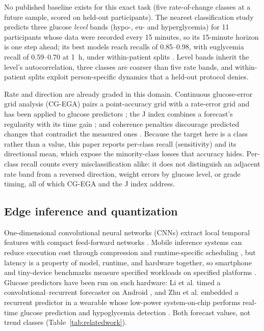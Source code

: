 \documentclass[10pt,twocolumn]{article}
\begin{document}
No published baseline exists for this exact task (five rate-of-change
classes at a future sample, scored on held-out participants). The
nearest classification study predicts three glucose \emph{level} bands
(hypo-, eu- and hyperglycemia) for 11 participants whose data were
recorded every 15 minutes, so its 15-minute horizon is one step ahead;
its best models reach recalls of 0.85--0.98, with euglycemia recall of
0.59--0.70 at 1~h, under within-patient splits
\cite{kistkins2023classification}. Level bands inherit the level's
autocorrelation, three classes are coarser than five rate bands, and
within-patient splits exploit person-specific dynamics that a held-out
protocol denies.

Rate and direction are already graded in this domain. Continuous
glucose-error grid analysis (CG-EGA) pairs a point-accuracy grid with a
rate-error grid \cite{kovatchev2004cgega} and has been applied to glucose
predictors \cite{zanderigo2007prediction}; the J index combines a
forecast's regularity with its time gain \cite{facchinetti2011index}; and
coherence penalties discourage predicted changes that contradict the
measured ones \cite{debois2019coherent}. Because the target here is a
class rather than a value, this paper reports per-class recall
(sensitivity) and its directional mean, which expose the minority-class
losses that accuracy hides. Per-class recall counts every misclassification
alike: it does not distinguish an adjacent rate band from a reversed
direction, weight errors by glucose level, or grade timing, all of which
CG-EGA and the J index address.

\subsection{Edge inference and quantization}
\label{sec:ptqrelated}

One-dimensional convolutional neural networks (CNNs) extract local temporal
features with compact feed-forward networks \cite{kiranyaz2021survey}. Mobile
inference systems can reduce execution cost through compression and
runtime-specific scheduling \cite{lane2016deepx}, but latency is a property of
model, runtime, and hardware together, so smartphone and tiny-device
benchmarks measure specified workloads on specified platforms
\cite{ignatov2019aibenchmark,banbury2021mlperftiny}. Glucose predictors have
been run on such hardware: Li et al. timed a convolutional--recurrent
forecaster on Android \cite{li2020crnn}, and Zhu et al. embedded a recurrent
predictor in a wearable whose low-power system-on-chip performs real-time
glucose prediction and hypoglycemia detection \cite{zhu2023iomt}. Both
forecast values, not trend classes (Table~\ref{tab:relatedwork}).
\end{document}
